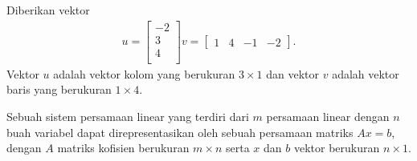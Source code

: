 \begin{contoh}    
Diberikan vektor
\begin{align*}    
u=
\begin{bmatrix}
-2 \\
3 \\
4 \\ 
\end{bmatrix} 
v=
\begin{bmatrix}
    1 & 4 & -1 & -2
\end{bmatrix}.
\end{align*}
Vektor $u$ adalah vektor kolom yang berukuran $3 \times 1$ dan vektor $v$ adalah vektor baris yang berukuran $1 \times 4$.
\end{contoh}

Sebuah sistem persamaan linear yang terdiri dari $m$ persamaan linear \mbox{dengan} $n$ buah variabel dapat direpresentasikan oleh sebuah persamaan matriks $Ax=b$, dengan $A$ matriks kofisien berukuran $m \times n$ serta $x$ dan $b$ vektor berukuran $n \times 1$.

